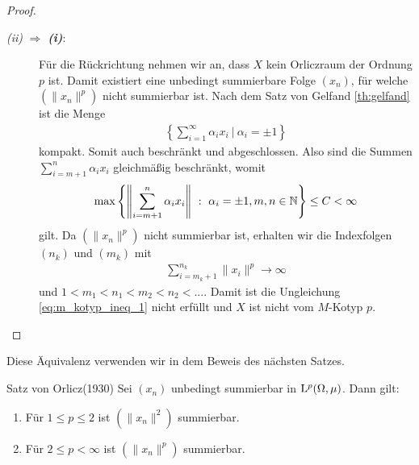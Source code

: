 \begin{proof}
\begin{description}
		\item[\textit{ \itshape\textrm{(ii)}} $ \Rightarrow $ \textbf{\textit{\textrm{(i)}}}:]
		Für die Rückrichtung nehmen wir an, dass $ X $ kein Orliczraum der Ordnung $ p $ ist.
		Damit existiert eine unbedingt summierbare Folge $ (x_n) $, für welche $ (\| x_n \|^p) $ nicht summierbar ist. 
		Nach dem Satz von Gelfand \ref{th:gelfand} ist die Menge 
		\begin{align*}
			\left\{\sum \limits_{i = 1}^\infty \alpha_i x_i\ | \ \alpha_i = \pm 1\right\}
		\end{align*}
		kompakt. Somit auch beschränkt und abgeschlossen.
		Also sind die Summen $ \sum_{i = m+1}^n \alpha_i x_i $ gleichmäßig beschränkt, womit
		\begin{align*}
			\max 
			\left\{
			\left\|
			\sum \limits_{i = m +1 }^n \alpha_i x_i
			\right\| 
			\ : \
			\alpha_i = \pm 1 , m,n\in  \mathbb{N}
			\right\} 
			\leq C < \infty
		\end{align*}
		gilt. Da $ (\| x_n \|^p) $ nicht summierbar ist, erhalten wir die Indexfolgen $ (n_k) $ und $ (m_k) $ mit
		\begin{align*}
			\sum \limits_{i = m_k + 1}^{n_k} \| x_i \|^p \to \infty
		\end{align*}
		und $ 1 < m_1 < n_1 < m_2< n_2<...$.
		Damit ist die Ungleichung \eqref{eq:m_kotyp_ineq_1} nicht erfüllt und $ X $ ist nicht vom $ M $-Kotyp $ p $.
		
	\end{description}
\end{proof}

Diese Äquivalenz verwenden wir in dem Beweis des nächsten Satzes.


\begin{genericthm}{Satz von Orlicz(1930)}
	Sei $ (x_n) $ unbedingt summierbar in $ \mathrm{L}^p(\Omega,\mu) $.
	Dann gilt:
	\begin{enumerate}
		\item Für $ 1 \leq p \leq 2 $ ist $  (\| x_n \|^2) $ summierbar.
		\item Für $ 2 \leq p < \infty $ ist $  (\| x_n \|^p) $ summierbar.
	\end{enumerate}
\end{genericthm}

